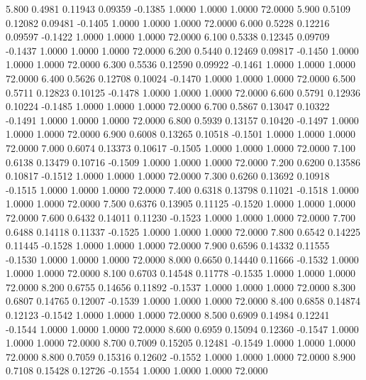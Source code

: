    5.800   0.4981   0.11943   0.09359  -0.1385   1.0000   1.0000   1.0000  72.0000
   5.900   0.5109   0.12082   0.09481  -0.1405   1.0000   1.0000   1.0000  72.0000
   6.000   0.5228   0.12216   0.09597  -0.1422   1.0000   1.0000   1.0000  72.0000
   6.100   0.5338   0.12345   0.09709  -0.1437   1.0000   1.0000   1.0000  72.0000
   6.200   0.5440   0.12469   0.09817  -0.1450   1.0000   1.0000   1.0000  72.0000
   6.300   0.5536   0.12590   0.09922  -0.1461   1.0000   1.0000   1.0000  72.0000
   6.400   0.5626   0.12708   0.10024  -0.1470   1.0000   1.0000   1.0000  72.0000
   6.500   0.5711   0.12823   0.10125  -0.1478   1.0000   1.0000   1.0000  72.0000
   6.600   0.5791   0.12936   0.10224  -0.1485   1.0000   1.0000   1.0000  72.0000
   6.700   0.5867   0.13047   0.10322  -0.1491   1.0000   1.0000   1.0000  72.0000
   6.800   0.5939   0.13157   0.10420  -0.1497   1.0000   1.0000   1.0000  72.0000
   6.900   0.6008   0.13265   0.10518  -0.1501   1.0000   1.0000   1.0000  72.0000
   7.000   0.6074   0.13373   0.10617  -0.1505   1.0000   1.0000   1.0000  72.0000
   7.100   0.6138   0.13479   0.10716  -0.1509   1.0000   1.0000   1.0000  72.0000
   7.200   0.6200   0.13586   0.10817  -0.1512   1.0000   1.0000   1.0000  72.0000
   7.300   0.6260   0.13692   0.10918  -0.1515   1.0000   1.0000   1.0000  72.0000
   7.400   0.6318   0.13798   0.11021  -0.1518   1.0000   1.0000   1.0000  72.0000
   7.500   0.6376   0.13905   0.11125  -0.1520   1.0000   1.0000   1.0000  72.0000
   7.600   0.6432   0.14011   0.11230  -0.1523   1.0000   1.0000   1.0000  72.0000
   7.700   0.6488   0.14118   0.11337  -0.1525   1.0000   1.0000   1.0000  72.0000
   7.800   0.6542   0.14225   0.11445  -0.1528   1.0000   1.0000   1.0000  72.0000
   7.900   0.6596   0.14332   0.11555  -0.1530   1.0000   1.0000   1.0000  72.0000
   8.000   0.6650   0.14440   0.11666  -0.1532   1.0000   1.0000   1.0000  72.0000
   8.100   0.6703   0.14548   0.11778  -0.1535   1.0000   1.0000   1.0000  72.0000
   8.200   0.6755   0.14656   0.11892  -0.1537   1.0000   1.0000   1.0000  72.0000
   8.300   0.6807   0.14765   0.12007  -0.1539   1.0000   1.0000   1.0000  72.0000
   8.400   0.6858   0.14874   0.12123  -0.1542   1.0000   1.0000   1.0000  72.0000
   8.500   0.6909   0.14984   0.12241  -0.1544   1.0000   1.0000   1.0000  72.0000
   8.600   0.6959   0.15094   0.12360  -0.1547   1.0000   1.0000   1.0000  72.0000
   8.700   0.7009   0.15205   0.12481  -0.1549   1.0000   1.0000   1.0000  72.0000
   8.800   0.7059   0.15316   0.12602  -0.1552   1.0000   1.0000   1.0000  72.0000
   8.900   0.7108   0.15428   0.12726  -0.1554   1.0000   1.0000   1.0000  72.0000
